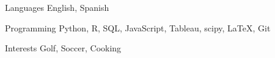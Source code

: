 

\begin{cvskills}

\cvskill
  {Languages} %
  {English, Spanish} %

  \cvskill
    {Programming} %
    {Python, R, SQL, JavaScript, Tableau, scipy, LaTeX, Git} %


  \cvskill
  {Interests}
  {Golf, Soccer, Cooking}

\end{cvskills}
